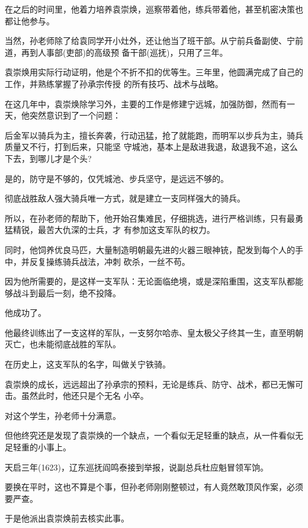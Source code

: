 \documentclass[11pt,a4paper,onecolumn]{article}
\begin{document}
在之后的时间里，他着力培养袁崇焕，巡察带着他，练兵带着他，甚至机密决策也都让他参与。

当然，孙老师除了给袁同学开小灶外，还让他当了班干部。从宁前兵备副使、宁前道，再到人事部(吏部)的高级预
备干部(巡抚)，只用了三年。

袁崇焕用实际行动证明，他是个不折不扣的优等生。三年里，他圆满完成了自己的工作，并熟练掌握了孙承宗传授
的所有技巧、战术与战略。

在这几年中，袁崇焕除学习外，主要的工作是修建宁远城，加强防御，然而有一天，他突然意识到了一个问题：

后金军以骑兵为主，擅长奔袭，行动迅猛，抢了就能跑，而明军以步兵为主，骑兵质量又不行，打到后来，只能坚
守城池，基本上是敌进我退，敌退我不追，这么下去，到哪儿才是个头?

是的，防守是不够的，仅凭城池、步兵坚守，是远远不够的。

彻底战胜敌人强大骑兵唯一方式，就是建立一支同样强大的骑兵。

所以，在孙老师的帮助下，他开始召集难民，仔细挑选，进行严格训练，只有最勇猛精锐，最苦大仇深的士兵，才
有参加这支军队的权力。

同时，他饲养优良马匹，大量制造明朝最先进的火器三眼神铳，配发到每个人的手中，并反复操练骑兵战法，冲刺
砍杀，一丝不苟。

因为他所需要的，是这样一支军队：无论面临绝境，或是深陷重围，这支军队都能够战斗到最后一刻，绝不投降。

他成功了。

他最终训练出了一支这样的军队，一支努尔哈赤、皇太极父子终其一生，直至明朝灭亡，也未能彻底战胜的军队。

在历史上，这支军队的名字，叫做关宁铁骑。

袁崇焕的成长，远远超出了孙承宗的预料，无论是练兵、防守、战术，都已无懈可击。虽然此时，他还只是个无名
小卒。

对这个学生，孙老师十分满意。

但他终究还是发现了袁崇焕的一个缺点，一个看似无足轻重的缺点，从一件看似无足轻重的小事上。

天启三年(1623)，辽东巡抚阎鸣泰接到举报，说副总兵杜应魁冒领军饷。

要换在平时，这也不算是个事，但孙老师刚刚整顿过，有人竟然敢顶风作案，必须要严查。

于是他派出袁崇焕前去核实此事。

\section[\thesection]{}
\end{document}
